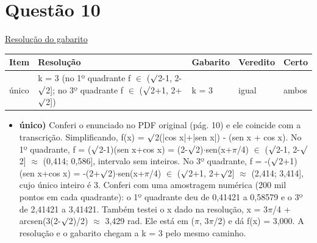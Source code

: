 \documentclass{article}%
\begin{document}
\section*{Questão 10}%
\href{https://poliedroresolve.sistemapoliedro.com.br/vestibulares/ita/2027/ita-2-fase-dia-1-20-10-2026-2-fase-dia-1/dissertativa-10-matematica-2-fase-dia-1-ita-2027}{Resolução do gabarito}\par\smallskip%
\begin{longtable}{@{}p{} p{} p{} p{} p{}@{}}\toprule Item & Resolução & Gabarito & Veredito & Certo \\ \midrule
único & k = 3 (no 1º quadrante f $\in$ ($\surd$2-1, 2-$\surd$2{]}; no 3º quadrante f $\in$ ($\surd$2+1, 2+$\surd$2{]}) & k = 3 & igual & ambos \\
\bottomrule\end{longtable}%
\begin{itemize}%
\item%
\textbf{único)} Conferi o enunciado no PDF original (pág. 10) e ele coincide com a transcrição. Simplificando, f(x) = $\surd$2(|cos x|+|sen x|) - (sen x + cos x). No 1º quadrante, f = ($\surd$2-1)(sen x+cos x) = (2-$\surd$2)$\cdot$sen(x+$\pi$/4) $\in$ ($\surd$2-1, 2-$\surd$2{]} $\approx$ (0,414; 0,586{]}, intervalo sem inteiros. No 3º quadrante, f = -($\surd$2+1)(sen x+cos x) = -(2+$\surd$2)$\cdot$sen(x+$\pi$/4) $\in$ ($\surd$2+1, 2+$\surd$2{]} $\approx$ (2,414; 3,414{]}, cujo único inteiro é 3. Conferi com uma amostragem numérica (200 mil pontos em cada quadrante): o 1º quadrante deu de 0,41421 a 0,58579 e o 3º de 2,41421 a 3,41421. Também testei o x dado na resolução, x = 3$\pi$/4 + arcsen(3(2-$\surd$2)/2) $\approx$ 3,429 rad. Ele está em ($\pi$, 3$\pi$/2) e dá f(x) = 3,000. A resolução e o gabarito chegam a k = 3 pelo mesmo caminho.%
\end{itemize}%
\end{document}
